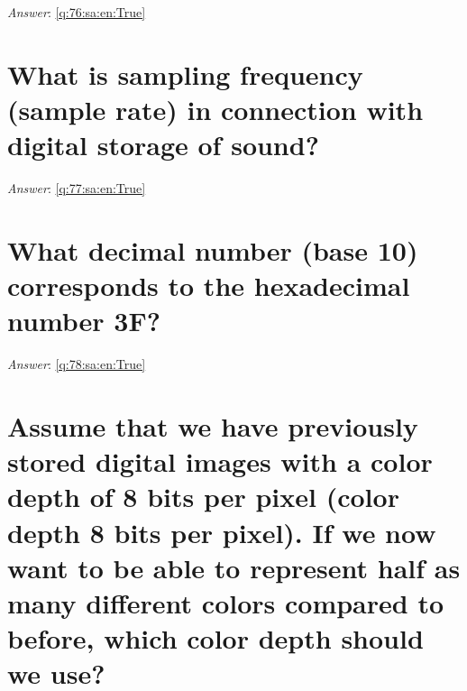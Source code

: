 \documentclass[a4paper,11pt,oneside]{book}
\begin{document}
\begin{sloppypar}
\label{q:76:sa:en:False}

\vspace{2cm}

\noindent\makebox[\textwidth]{\hrulefill}

\vspace{1cm}

\textit{Answer}: \autoref{q:76:sa:en:True}



\section{What is sampling frequency (sample rate) in connection with digital storage of sound?}

\label{q:77:sa:en:False}

\vspace{2cm}

\noindent\makebox[\textwidth]{\hrulefill}

\vspace{1cm}

\textit{Answer}: \autoref{q:77:sa:en:True}



\section{What decimal number (base 10) corresponds to the hexadecimal number 3F?}

\label{q:78:sa:en:False}

\vspace{2cm}

\noindent\makebox[\textwidth]{\hrulefill}

\vspace{1cm}

\textit{Answer}: \autoref{q:78:sa:en:True}



\section{Assume that we have previously stored digital images with a color depth of 8 bits per pixel (color depth 8 bits per pixel). If we now want to be able to represent half as many different colors compared to before, which color depth should we use?}

\label{q:79:sa:en:False}

\vspace{2cm}

\noindent\makebox[\textwidth]{\hrulefill}


\end{sloppypar}
\end{document}
